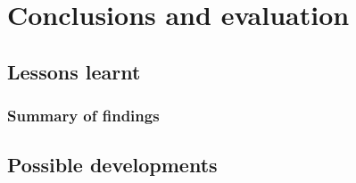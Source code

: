 
\chapter{Conclusions and evaluation} %

\label{Chapter7} %


\section{Lessons learnt}



\subsection{Summary of findings}




\section{Possible developments}

